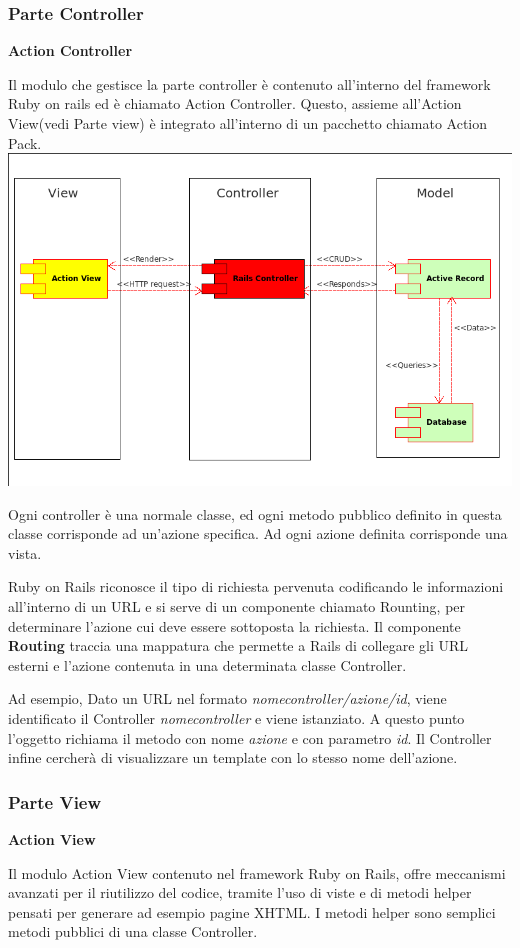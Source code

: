\documentclass[11pt,a4paper]{article}
\begin{document}
\subsubsection{Parte Controller}
\begin{center}
 \textbf{Action Controller}
\end{center}
Il modulo che gestisce la parte controller è contenuto all'interno del framework Ruby on rails ed è chiamato Action Controller.
Questo, assieme all'Action View(vedi Parte view) è integrato all'interno di un pacchetto chiamato Action Pack.
\includegraphics[scale=0.50]{images/SIGEOL.png}


Ogni controller è una normale classe, ed ogni metodo pubblico definito in questa classe corrisponde ad un'azione specifica.
Ad ogni azione definita corrisponde una vista. 

Ruby on Rails riconosce il tipo di richiesta pervenuta codificando le informazioni all'interno di un URL e si serve di un componente chiamato Rounting, per determinare l'azione cui deve essere sottoposta la richiesta.
Il componente \textbf{Routing} traccia una mappatura che permette a Rails di collegare gli URL esterni e l'azione contenuta in una determinata classe Controller.


Ad esempio, Dato un URL nel formato \textit{nomecontroller/azione/id}, viene identificato il Controller \textit{nomecontroller} e viene istanziato. A questo punto l'oggetto richiama il metodo con nome \textit{azione} e con parametro \textit{id}. Il Controller infine cercherà di visualizzare un template con lo stesso nome dell'azione. 

\subsubsection{Parte View}
\begin{center}
 \textbf{Action View}
\end{center}
 Il modulo Action View contenuto nel framework Ruby on Rails, offre meccanismi avanzati per il riutilizzo del codice, tramite l'uso di viste e di metodi helper pensati per generare ad esempio pagine XHTML.
I metodi helper sono semplici metodi pubblici di una classe Controller.
\end{document}

